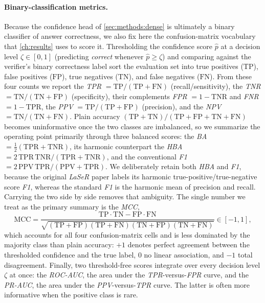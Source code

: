 \documentclass[a4paper,oneside,10pt,english]{scrbook}
\DeclareRobustCommand{\acfit}[1]{\textit{\ac{#1}}}
\begin{document}
\paragraph{Binary-classification metrics.}
Because the confidence head of \autoref{sec:methods:dense} is ultimately a binary classifier of answer correctness, we also fix here the confusion-matrix vocabulary that \autoref{ch:results} uses to score it. Thresholding the confidence score $\hat p$ at a decision level $\zeta \in [0,1]$ (predicting \emph{correct} whenever $\hat p \ge \zeta$) and comparing against the verifier's binary correctness label sort the evaluation set into true positives ($\mathrm{TP}$), false positives ($\mathrm{FP}$), true negatives ($\mathrm{TN}$), and false negatives ($\mathrm{FN}$). From these four counts we report the \acfit{TPR} $=\mathrm{TP}/(\mathrm{TP}+\mathrm{FN})$ (recall/sensitivity), the \acfit{TNR} $=\mathrm{TN}/(\mathrm{TN}+\mathrm{FP})$ (specificity), their complements \acfit{FPR} $=1-\mathrm{TNR}$ and \acfit{FNR} $=1-\mathrm{TPR}$, the \acfit{PPV} $=\mathrm{TP}/(\mathrm{TP}+\mathrm{FP})$ (precision), and the \acfit{NPV} $=\mathrm{TN}/(\mathrm{TN}+\mathrm{FN})$. Plain accuracy $(\mathrm{TP}+\mathrm{TN})/(\mathrm{TP}+\mathrm{FP}+\mathrm{TN}+\mathrm{FN})$ becomes uninformative once the two classes are imbalanced, so we summarize the operating point primarily through three balanced scores: the \acfit{BA} $=\tfrac{1}{2}(\mathrm{TPR}+\mathrm{TNR})$, its harmonic counterpart the \acfit{HBA} $=2\,\mathrm{TPR}\,\mathrm{TNR}/(\mathrm{TPR}+\mathrm{TNR})$, and the conventional \acfit{F1} $=2\,\mathrm{PPV}\,\mathrm{TPR}/(\mathrm{PPV}+\mathrm{TPR})$. We deliberately retain both \acfit{HBA} and \acfit{F1}, because the original \acfit{LaSeR} paper \citep{laser} labels its harmonic true-positive/true-negative score \emph{F1}, whereas the standard \acfit{F1} is the harmonic mean of precision and recall. Carrying the two side by side removes that ambiguity. The single number we treat as the primary summary is the \acfit{MCC},
\begin{equation}
	\label{eq:mcc}
	\mathrm{MCC} = \frac{\mathrm{TP}\cdot\mathrm{TN} - \mathrm{FP}\cdot\mathrm{FN}}{\sqrt{(\mathrm{TP}+\mathrm{FP})(\mathrm{TP}+\mathrm{FN})(\mathrm{TN}+\mathrm{FP})(\mathrm{TN}+\mathrm{FN})}} \in [-1, 1],
\end{equation}
which accounts for all four confusion-matrix cells and is less dominated by the majority class than plain accuracy: $+1$ denotes perfect agreement between the thresholded confidence and the true label, $0$ no linear association, and $-1$ total disagreement. Finally, two threshold-free scores integrate over every decision level $\zeta$ at once: the \acfit{ROC-AUC}, the area under the \acfit{TPR}-versus-\acfit{FPR} curve, and the \acfit{PR-AUC}, the area under the \acfit{PPV}-versus-\acfit{TPR} curve. The latter is often more informative when the positive class is rare.
\end{document}
